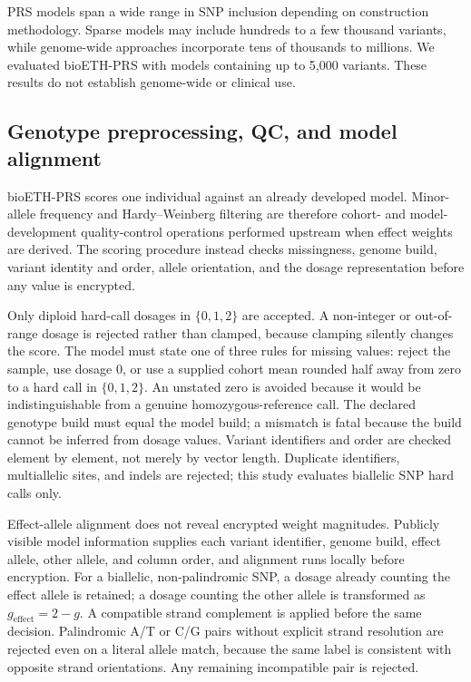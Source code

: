 \documentclass[10pt]{article}
\begin{document}
PRS models span a wide range in SNP inclusion depending on construction methodology.
Sparse models may include hundreds to a few thousand variants, while genome-wide
approaches incorporate tens of thousands to millions.  We evaluated bioETH-PRS with
models containing up to 5,000 variants.  These results do not establish genome-wide or
clinical use.

\subsection{Genotype preprocessing, QC, and model alignment}
\label{sec:preprocessing}

bioETH-PRS scores one individual against an already developed model.  Minor-allele
frequency and Hardy--Weinberg filtering are therefore cohort- and model-development
quality-control operations performed upstream when effect weights are derived.  The
scoring procedure instead checks missingness, genome build, variant identity and
order, allele orientation, and the dosage representation before any value is encrypted.

Only diploid hard-call dosages in $\{0,1,2\}$ are accepted.  A non-integer or
out-of-range dosage is rejected rather than clamped, because clamping silently changes
the score.  The model must state one of three rules for missing values: reject the
sample, use dosage 0, or use a supplied cohort mean rounded half away from zero to a
hard call in $\{0,1,2\}$.  An unstated zero is avoided because it would be
indistinguishable from a genuine homozygous-reference call.
The declared genotype build must equal the model build; a mismatch is fatal because the
build cannot be inferred from dosage values.  Variant identifiers and order are checked
element by element, not merely by vector length.  Duplicate identifiers, multiallelic
sites, and indels are rejected; this study evaluates biallelic SNP hard calls only.

Effect-allele alignment does not reveal encrypted weight magnitudes.  Publicly visible model
information supplies each variant identifier, genome build, effect allele, other allele,
and column order, and alignment runs locally before encryption.  For a biallelic,
non-palindromic SNP, a dosage already counting the effect allele is retained; a dosage
counting the other allele is transformed as $g_{\mathrm{effect}}=2-g$.  A compatible
strand complement is applied before the same decision.  Palindromic A/T or C/G pairs
without explicit strand resolution are rejected even on a literal allele match, because
the same label is consistent with opposite strand orientations.  Any remaining
incompatible pair is rejected.
\end{document}
